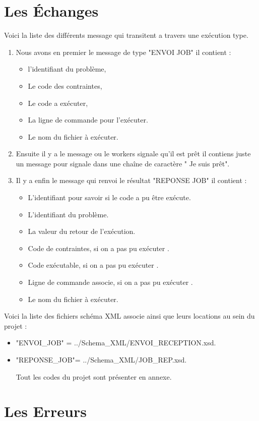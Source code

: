 \documentclass[11pt]{report}
\begin{document}
\chapter{Les Échanges} 
Voici la liste des différents message qui transitent a travers une exécution type.
\begin{enumerate} \item Nous avons en premier le message de type "ENVOI JOB" il contient :
\begin{itemize}
\item l'identifiant du problème,
\item Le code des contraintes,
\item Le code a exécuter,
\item La ligne de  commande pour l\textquoteright exécuter.
\item Le nom du fichier à exécuter.
\end{itemize}
\item Ensuite il y a le message ou le workers signale qu'il est prêt il contiens juste un message pour signale dans une chaîne de caractère " Je suis prêt".
\item Il y a enfin le message qui renvoi le résultat "REPONSE JOB" il contient : 
\begin{itemize}
\item L'identifiant pour savoir si le code a pu être exécute.
\item L'identifiant du problème.
\item La valeur du retour de l\textquoteright exécution.
\item Code de contraintes, si on a pas pu exécuter .
\item Code exécutable, si on a pas pu exécuter .
\item Ligne de commande associe,  si on a pas pu exécuter .
\item Le nom du fichier à exécuter.
\end{itemize}
\end{enumerate}
Voici la liste des fichiers schéma XML associe ainsi que leurs locations au sein du projet :
\begin{itemize}
\item "ENVOI\_JOB" = ../Schema\_XML/ENVOI\_RECEPTION.xsd.
\item "REPONSE\_JOB"= ../Schema\_XML/JOB\_REP.xsd.

Tout les codes du projet sont présenter en annexe.
\end{itemize}

\newpage
\chapter{Les Erreurs} 
\end{document}
